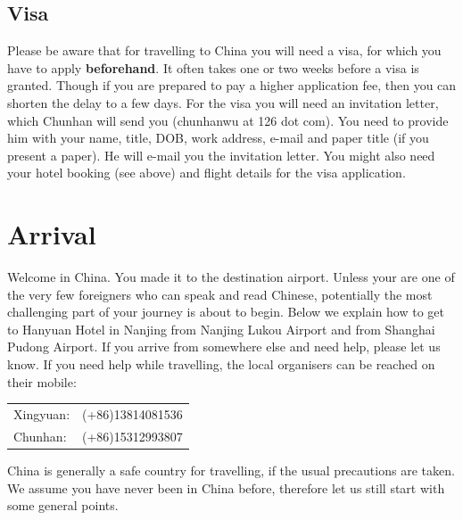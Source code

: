\documentclass[11pt]{report}
\def\cwemail{chunhanwu at 126 dot com}
\begin{document}
\section{Visa}

Please be aware that for travelling to China you will need a
visa, for which you have to apply {\bf beforehand}. It often takes
one or two weeks before a visa is granted. Though if you 
are prepared to pay a higher application fee, then you can 
shorten the delay to a few days. For the visa you
will need an invitation letter, which Chunhan will send you
(\cwemail). You need to provide him with your name, title, 
DOB, work address, e-mail and paper title (if you present a paper). 
He will e-mail you the invitation letter. You might also need
your hotel booking (see above) and flight details for the visa
application.



\chapter{Arrival}

Welcome in China. You made it to the destination airport.
Unless your are one of the very few foreigners who can speak
and read Chinese, potentially the most challenging part of
your journey is about to begin. Below we explain how to get to
Hanyuan Hotel in Nanjing from Nanjing Lukou Airport and from
Shanghai Pudong Airport. If you arrive from somewhere else and
need help, please let us know. If you need help while 
travelling, the local organisers can be reached on their 
mobile:

\begin{center}
\begin{tabular}{ll}
Xingyuan: & (+86)\hspace{2mm}13814081536\\
Chunhan:  & (+86)\hspace{2mm}15312993807\\
\end{tabular}
\end{center}

China is generally a safe country for travelling, if the usual
precautions are taken. We assume you have never been in China 
before, therefore let us still start with some general points.
\end{document}
